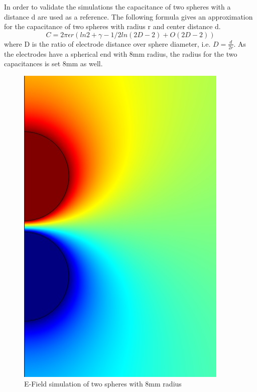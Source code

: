 In order to validate the simulations the capacitance of two spheres with a distance d are used as a reference. The following formula gives an approximation for the capacitance of two spheres with radius r and center distance d. \cite{Rawlins}
\begin{equation}
C=2 \pi \epsilon r ( ln 2 + \gamma -1/2 ln(2D-2)+O(2D-2))
\end{equation}
where D is the ratio of electrode distance over sphere diameter, i.e. $ D=\frac{d}{2r}$. As the electrodes have a spherical end with 8mm radius, the radius for the two capacitances is set 8mm as well. 
\begin{figure}[htbp]
	\centering
	\includegraphics[scale=0.3]{figures/Method/Part1_d_C0/sphere_capacity.jpg}		
	\caption[Kurze Abbildungsbeschreibung]{E-Field simulation of two spheres with 8mm radius } \label{fig.comsol_sphere}

\end{figure}


